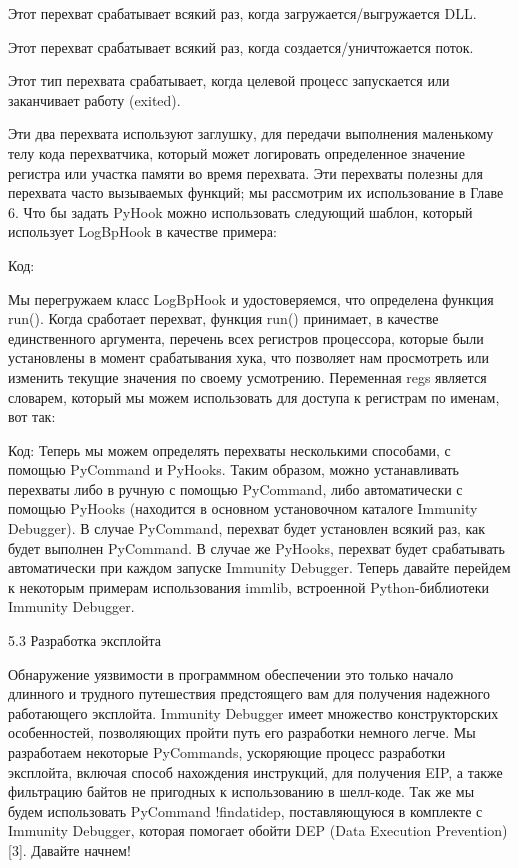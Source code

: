 \documentclass[12pt]{book}
\begin{document}
Этот перехват срабатывает всякий раз, когда загружается/выгружается DLL.

Этот перехват срабатывает всякий раз, когда создается/уничтожается поток.

Этот тип перехвата срабатывает, когда целевой процесс запускается или заканчивает работу (exited). 

Эти два перехвата используют заглушку, для передачи выполнения маленькому телу кода перехватчика, который может логировать определенное значение регистра или участка памяти во время перехвата. Эти перехваты полезны для перехвата часто вызываемых функций; мы рассмотрим их использование в Главе 6.
Что бы задать PyHook можно использовать следующий шаблон, который использует LogBpHook в качестве примера:

Код:



Мы перегружаем класс LogBpHook и удостоверяемся, что определена функция run(). Когда сработает перехват, функция run() принимает, в качестве единственного аргумента, перечень всех регистров процессора, которые были установлены в момент срабатывания хука, что позволяет нам просмотреть или изменить текущие значения по своему усмотрению. Переменная regs является словарем, который мы можем использовать для доступа к регистрам по именам, вот так:

Код:
Теперь мы можем определять перехваты несколькими способами, с помощью PyCommand и PyHooks. Таким образом, можно устанавливать перехваты либо в ручную с помощью PyCommand, либо автоматически с помощью PyHooks (находится в основном установочном каталоге Immunity Debugger). В случае PyCommand, перехват будет установлен всякий раз, как будет выполнен PyCommand. В случае же PyHooks, перехват будет срабатывать автоматически при каждом запуске Immunity Debugger. Теперь давайте перейдем к некоторым примерам использования immlib, встроенной Python-библиотеки Immunity Debugger. 


5.3 Разработка эксплойта

Обнаружение уязвимости в программном обеспечении это только начало длинного и трудного путешествия предстоящего вам для получения надежного работающего эксплойта. Immunity Debugger имеет множество конструкторских особенностей, позволяющих пройти путь его разработки немного легче. Мы разработаем некоторые PyCommands, ускоряющие процесс разработки эксплойта, включая способ нахождения инструкций, для получения EIP, а также фильтрацию байтов не пригодных к использованию в шелл-коде. Так же мы будем использовать PyCommand !findatidep, поставляющуюся в комплекте с Immunity Debugger, которая помогает обойти DEP (Data Execution Prevention) [3]. Давайте начнем! 
\end{document}
